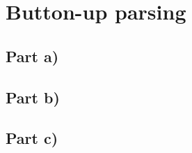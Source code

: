 \documentclass[paper=a4, fontsize=11pt]{scrartcl} %
\numberwithin{equation}{section} %
\numberwithin{figure}{section} %
\numberwithin{table}{section} %
\begin{document}
\section{Button-up parsing}
\subsection{Part a)}
\subsection{Part b)}
\subsection{Part c)}
\end{document}
